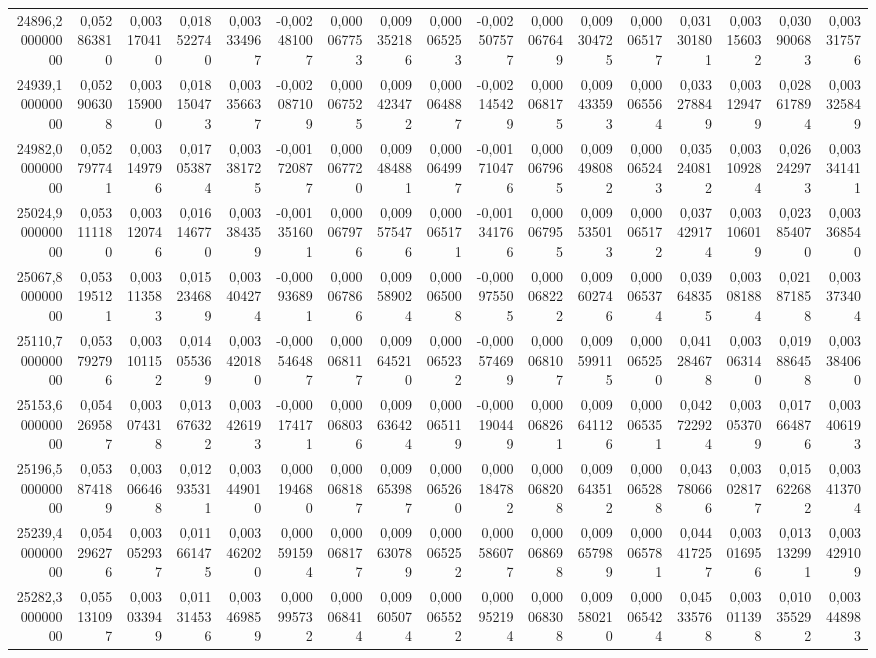 \begin{longtable}{rrrrrrrrrrrrrrrrr}
24896,200000000 & 0,052863810 & 0,003170410 & 0,018522740 & 0,003334967 & -0,002481007 & 0,000067753 & 0,009352186 & 0,000065253 & -0,002507577 & 0,000067649 & 0,009304725 & 0,000065177 & 0,031301801 & 0,003156032 & 0,030900683 & 0,003317576\\
24939,100000000 & 0,052906308 & 0,003159000 & 0,018150473 & 0,003356637 & -0,002087109 & 0,000067525 & 0,009423472 & 0,000064887 & -0,002145429 & 0,000068175 & 0,009433593 & 0,000065564 & 0,033278849 & 0,003129479 & 0,028617894 & 0,003325849\\
24982,000000000 & 0,052797741 & 0,003149796 & 0,017053874 & 0,003381725 & -0,001720877 & 0,000067720 & 0,009484881 & 0,000064997 & -0,001710476 & 0,000067965 & 0,009498082 & 0,000065243 & 0,035240812 & 0,003109284 & 0,026242973 & 0,003341411\\
25024,900000000 & 0,053111180 & 0,003120746 & 0,016146770 & 0,003384359 & -0,001351601 & 0,000067976 & 0,009575476 & 0,000065171 & -0,001341766 & 0,000067955 & 0,009535013 & 0,000065172 & 0,037429174 & 0,003106019 & 0,023854070 & 0,003368540\\
25067,800000000 & 0,053195121 & 0,003113583 & 0,015234689 & 0,003404274 & -0,000936891 & 0,000067866 & 0,009589024 & 0,000065008 & -0,000975505 & 0,000068222 & 0,009602746 & 0,000065374 & 0,039648355 & 0,003081884 & 0,021871858 & 0,003373404\\
25110,700000000 & 0,053792796 & 0,003101152 & 0,014055369 & 0,003420180 & -0,000546487 & 0,000068117 & 0,009645210 & 0,000065232 & -0,000574699 & 0,000068107 & 0,009599115 & 0,000065250 & 0,041284678 & 0,003063140 & 0,019886458 & 0,003384060\\
25153,600000000 & 0,054269587 & 0,003074318 & 0,013676322 & 0,003426193 & -0,000174171 & 0,000068036 & 0,009636424 & 0,000065119 & -0,000190449 & 0,000068261 & 0,009641126 & 0,000065351 & 0,042722924 & 0,003053709 & 0,017664876 & 0,003406193\\
25196,500000000 & 0,053874189 & 0,003066468 & 0,012935311 & 0,003449010 & 0,000194680 & 0,000068187 & 0,009653987 & 0,000065260 & 0,000184782 & 0,000068208 & 0,009643512 & 0,000065288 & 0,043780666 & 0,003028177 & 0,015622682 & 0,003413704\\
25239,400000000 & 0,054296276 & 0,003052937 & 0,011661475 & 0,003462020 & 0,000591594 & 0,000068177 & 0,009630789 & 0,000065252 & 0,000586077 & 0,000068698 & 0,009657989 & 0,000065781 & 0,044417257 & 0,003016956 & 0,013132991 & 0,003429109\\
25282,300000000 & 0,055131097 & 0,003033949 & 0,011314536 & 0,003469859 & 0,000995732 & 0,000068414 & 0,009605074 & 0,000065522 & 0,000952194 & 0,000068308 & 0,009580210 & 0,000065424 & 0,045335768 & 0,003011398 & 0,010355292 & 0,003448983\\

\end{longtable}
